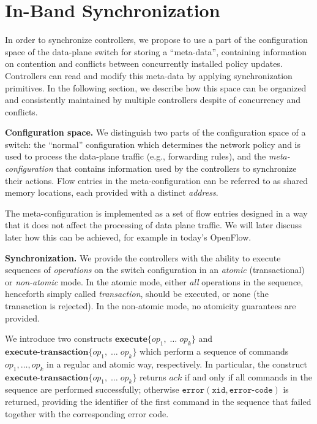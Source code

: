 \documentclass[conference]{sigcomm-alternate}
\newcommand{\petr}[1]{\textit{\textcolor{blue}{[petr]: #1}}} %
\newcommand{\error}{\texttt{error}}
\newcommand{\xid}{\texttt{xid}}
\newcommand{\ecode}{\texttt{error-code}}
\newcommand{\exec}{\textbf{execute}}
\newcommand{\execatomic}{\textbf{execute-transaction}}
\newcommand{\ack}{\textit{ack}}
\begin{document}
\section{In-Band Synchronization}\label{sec:main}

In order to synchronize controllers, 
we propose to use a part of the configuration space of the data-plane
switch for storing  a 
``meta-data'', containing information
on contention and conflicts between
concurrently installed policy updates. 
Controllers can read and modify
this meta-data by applying synchronization primitives.
In the following section, we
describe how this space can be organized and consistently maintained
by multiple controllers despite of concurrency and conflicts.


\vspace{1mm}
\noindent\textbf{Configuration space.}
%
We distinguish two parts of the configuration space of a switch:
the ``normal'' configuration which determines the network policy and
is used to process the data-plane traffic (e.g., forwarding rules),
and the \emph{meta-configuration} that contains information used by the
controllers to synchronize their actions.
Flow entries in the meta-configuration can be referred to as shared
memory locations, each provided with a distinct \emph{address}.

The meta-configuration is implemented as a set of flow entries
designed in a way that it does not affect the processing of data plane
traffic. 
We will later discuss later how this can be achieved, for example in 
today's OpenFlow.



\vspace{1mm}
\noindent\textbf{Synchronization.}
We provide the controllers with the ability to execute
sequences of \emph{operations} on the
switch configuration in an \emph{atomic} (transactional) or \emph{non-atomic} mode.
In the atomic mode, either \emph{all} operations in the sequence, henceforth simply
called \emph{transaction},
should be executed, or none (the transaction is rejected).
In the non-atomic mode, no atomicity guarantees are provided.

We introduce two constructs
$\exec\{op_1,\;\ldots\;op_k\}$ and $\execatomic\{op_1,\;\ldots\;op_k\}$
which perform a sequence of commands $op_1,\ldots,op_k$ in
a regular and atomic way, respectively.
In particular, the construct $\execatomic\{op_1,\;\ldots\;op_k\}$  
returns $\ack$ if and only if all commands in the sequence are performed successfully; otherwise
$\error(\xid,\ecode)$ is returned, providing
the identifier of the first command in the sequence that failed
together with the corresponding error code.
\end{document}
